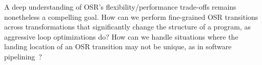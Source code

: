 
A deep understanding of OSR's flexibility/performance trade-offs remains nonetheless a compelling goal. How can we perform fine-grained OSR transitions across transformations that significantly change the structure of a program, as aggressive loop optimizations do? How can we handle situations where the landing location of an OSR transition may not be unique, as in software pipelining~\cite{Kundu09}? %

